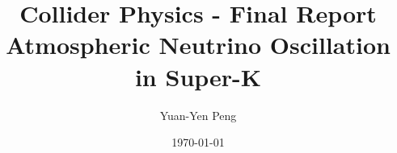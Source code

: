 \documentclass[12pt]{article}
\begin{document}
\pagestyle{fancy}
    \fancyhf{} %
    \renewcommand{\headrulewidth}{0pt} %
    \fancyfoot[C]{\thepage}

\title{{\vspace{-2.0cm}
        \normalsize Collider Physics - Final Report}\\
        \textbf{Atmospheric Neutrino Oscillation in Super-K}}
\author{Yuan-Yen Peng}
\date{\today}
\thispagestyle{fancy}
\maketitle
\end{document}
